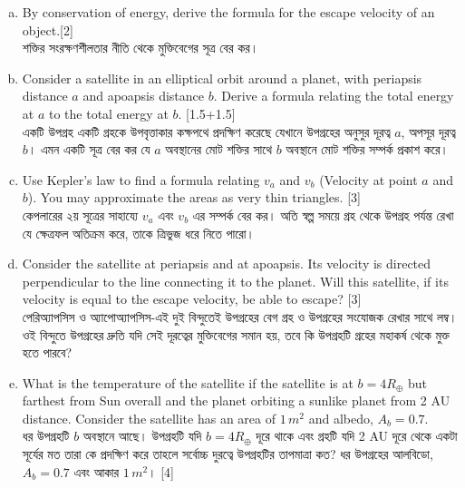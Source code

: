 \documentclass[10pt,a5paper,twoside]{article}
\begin{document}
\begin{enumerate}[a.]
	\item By conservation of energy, derive the formula for the escape velocity of an object.\hfill [2]\\শক্তির সংরক্ষণশীলতার নীতি থেকে মুক্তিবেগের সূত্র বের কর।
	
	\item Consider a satellite in an elliptical orbit around a planet, with periapsis distance 	$a$ and apoapsis distance $b$.  Derive a formula relating the total energy at $a$ to the total energy at $b$. \hfill[1.5+1.5]\\একটি উপগ্রহ একটি গ্রহকে উপবৃত্তাকার কক্ষপথে প্রদক্ষিণ করেছে যেখানে উপগ্রহের অনুসুর দূরত্ব $ a $, অপসূর দূরত্ব $ b $। এমন একটি সূত্র বের কর যে $ a $ অবস্থানের মোট শক্তির সাথে $ b $ অবস্থানে মোট শক্তির সম্পর্ক প্রকাশ করে।
	\item Use Kepler's  law to find a formula relating $v_a$ and $v_b$ (Velocity at point $a$ and $b$). You may approximate the areas as very thin triangles. \hfill[3]\\কেপলারের ২য় সূত্রের সাহায্যে $ v_a $ এবং $ v_b $ এর সম্পর্ক বের কর। অতি স্বল্প সময়ে গ্রহ থেকে উপগ্রহ পর্যন্ত রেখা যে ক্ষেত্রফল অতিক্রম করে, তাকে ত্রিভুজ ধরে নিতে পারো।
	\item Consider the satellite at periapsis and at apoapsis. Its velocity is directed perpendicular to the line connecting it to the planet. Will this satellite, if its velocity is equal to the escape velocity, be able to escape? \hfill[3]\\
	পেরিঅ্যাপসিস ও অ্যাপোঅ্যাপসিস-এই দুই বিন্দুতেই উপগ্রহের বেগ গ্রহ ও উপগ্রহের সংযোজক রেখার সাথে লম্ব। ওই বিন্দুতে উপগ্রহের দ্রুতি যদি সেই দূরত্বের মুক্তিবেগের সমান হয়, তবে কি উপগ্রহটি গ্রহের মহাকর্ষ থেকে মুক্ত হতে পারবে?
	\item What is the temperature of the satellite if the satellite is at $b= 4R_\oplus$ but farthest from Sun overall and the planet orbiting a sunlike planet from 2 AU distance. Consider the satellite has an area of $1\,m^2$ and albedo, $A_b=0.7$.\\
	ধর উপগ্রহটি $b$ অবস্থানে আছে। উপগ্রহটি যদি $b= 4R_\oplus $ দূরে থাকে এবং গ্রহটি যদি 2 AU দূরে থেকে একটা সূর্যের মত তারা কে প্রদক্ষিণ করে তাহলে সর্বোচ্চ দুরত্বে উপগ্রহটির তাপমাত্রা কত? ধর উপগ্রহের আলবিডো, $A_b=0.7$ এবং আকার $1\,m^2$।   \hfill[4]
\end{enumerate}
\end{document}
